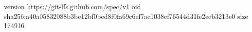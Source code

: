 version https://git-lfs.github.com/spec/v1
oid sha256:a40a05832088b3be12bf0bed8f0fa69c6ef7ac1038ef76544d31fe2eeb3213e0
size 174916
